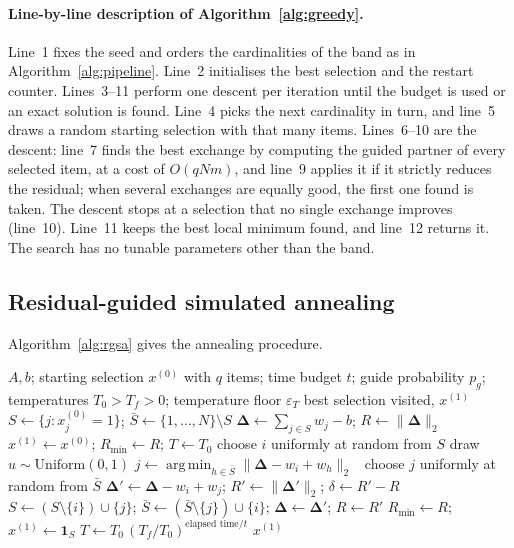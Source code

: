 \documentclass[pdflatex,sn-mathphys-num]{sn-jnl}
\theoremstyle{thmstyleone}
\theoremstyle{thmstylethree}
\newcommand{\res}{\boldsymbol{\Delta}}
\DeclareMathOperator*{\argmin}{arg\,min}
\begin{document}
\paragraph{Line-by-line description of Algorithm~\ref{alg:greedy}.}
Line~1 fixes the seed and orders the cardinalities of the band as in Algorithm~\ref{alg:pipeline}. Line~2 initialises the best selection and the restart counter. Lines~3--11 perform one descent per iteration until the budget is used or an exact solution is found. Line~4 picks the next cardinality in turn, and line~5 draws a random starting selection with that many items. Lines~6--10 are the descent: line~7 finds the best exchange by computing the guided partner of every selected item, at a cost of $O(qNm)$, and line~9 applies it if it strictly reduces the residual; when several exchanges are equally good, the first one found is taken. The descent stops at a selection that no single exchange improves (line~10). Line~11 keeps the best local minimum found, and line~12 returns it. The search has no tunable parameters other than the band.

\subsection{Residual-guided simulated annealing}
Algorithm~\ref{alg:rgsa} gives the annealing procedure.

\begin{algorithm}[t]
\caption{RGSA: residual-guided simulated annealing}\label{alg:rgsa}
\begin{algorithmic}[1]
\Require $A,b$; starting selection $x^{(0)}$ with $q$ items; time budget $t$; guide probability $p_g$; temperatures $T_0>T_f>0$; temperature floor $\varepsilon_T$
\Ensure best selection visited, $x^{(1)}$
\State $S\gets\{j:x^{(0)}_j=1\}$; $\bar S\gets\{1,\dots,N\}\setminus S$
\State $\res\gets\sum_{j\in S}w_j-b$; $R\gets\|\res\|_2$
\State $x^{(1)}\gets x^{(0)}$; $R_{\min}\gets R$; $T\gets T_0$
  \State choose $i$ uniformly at random from $S$
  \State draw $u\sim\mathrm{Uniform}(0,1)$
   $j\gets\argmin_{h\in\bar S}\|\res-w_i+w_h\|_2$ 
  \Else\ choose $j$ uniformly at random from $\bar S$ 
  \EndIf
  \State $\res'\gets\res-w_i+w_j$; $R'\gets\|\res'\|_2$; $\delta\gets R'-R$
    \State $S\gets(S\setminus\{i\})\cup\{j\}$; $\bar S\gets(\bar S\setminus\{j\})\cup\{i\}$; $\res\gets\res'$; $R\gets R'$
     $R_{\min}\gets R$; $x^{(1)}\gets\mathbf 1_S$ \EndIf
  \EndIf
  \State $T\gets T_0\,(T_f/T_0)^{\text{elapsed time}/t}$ 
\EndWhile
\State \Return $x^{(1)}$
\end{algorithmic}
\end{algorithm}
\end{document}
